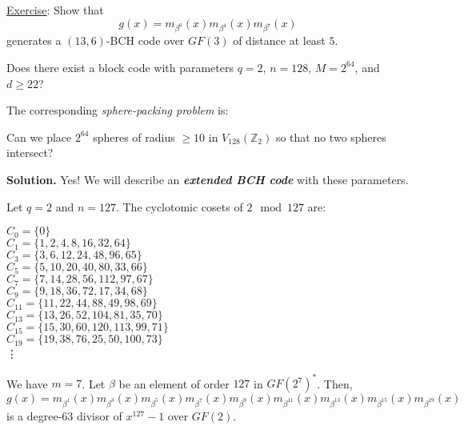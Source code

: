 \underline{Exercise}: Show that
\[ g(x)=m_{\beta^0}(x)m_{\beta^4}(x)m_{\beta^7}(x) \]
generates a $ (13,6) $-BCH code over $ GF(3) $ of distance at least $ 5 $.

\begin{exbox}
    \begin{example}
        Does there exist a block code with parameters
        $ q=2 $, $ n=128 $, $ M=2^{64} $, and $ d\geqslant 22 $?

        The corresponding \emph{sphere-packing problem} is:

        Can we place $ 2^{64} $ spheres of radius
        $ \geqslant 10 $ in $ V_{128}(\mathbb{Z}_2) $
        so that no two spheres intersect?

        \textbf{Solution.} Yes! We will describe an
        \textbf{\emph{extended BCH code}} with these parameters.

        Let $ q=2 $ and $ n=127 $. The cyclotomic cosets
        of $ 2\mod 127 $ are:

        \begin{center}
            \begin{multicols}{2}
                $ C_0=\{0\} $\\
                $ C_1=\{1,2,4,8,16,32,64\} $\\
                $ C_3=\{3,6,12,24,48,96,65\} $\\
                $ C_5=\{5,10,20,40,80,33,66\} $\\
                $ C_7=\{7,14,28,56,112,97,67\} $\\
                $ C_9=\{9,18,36,72,17,34,68\} $\\
                $ C_{11}=\{11,22,44,88,49,98,69\} $\\
                $ C_{13}=\{13,26,52,104,81,35,70\} $\\
                $ C_{15}=\{15,30,60,120,113,99,71\} $\\
                $ C_{19}=\{19,38,76,25,50,100,73\} $\\
                \vdots
            \end{multicols}
        \end{center}

        We have $ m=7 $. Let $ \beta $ be an element of order $ 127 $
        in $ GF(2^7)^* $. Then,
        \[ g(x)=m_{\beta^1}(x)m_{\beta^3}(x)m_{\beta^5}(x)m_{\beta^7}(x)
            m_{\beta^9}(x)m_{\beta^{11}}(x)m_{\beta^{13}}(x)
            m_{\beta^{15}}(x)m_{\beta^{19}}(x) \]
        is a degree-$ 63 $ divisor of $ x^{127}-1 $ over $ GF(2) $.


\end{example}
\end{exbox}
